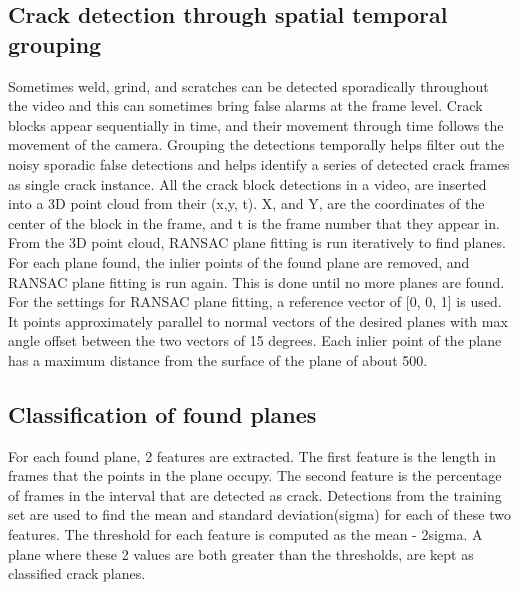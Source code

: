 \subsection{Crack detection through spatial temporal grouping}
            Sometimes weld, grind, and scratches can be detected sporadically throughout the video and this can sometimes bring false alarms at the frame level. Crack blocks appear sequentially in time, and their movement through time follows the movement of the camera.  Grouping the detections temporally helps filter out the noisy sporadic false detections and helps identify a series of detected crack frames as single crack instance.
All the crack block detections in a video, are inserted into a 3D point cloud from their (x,y, t). X, and Y, are the coordinates of the center of the block in the frame, and t is the frame number that they appear in.   From the 3D point cloud, RANSAC plane fitting is run iteratively to find planes.  For each plane found, the inlier points of the found plane are removed, and RANSAC plane fitting is run again. This is done until no more planes are found.  For the settings for RANSAC plane fitting, a reference vector of [0, 0, 1] is used. It points approximately parallel to normal vectors of the desired planes with max angle offset between the two vectors of 15 degrees. Each inlier point of the plane has a maximum distance from the surface of the plane of about 500.  

\subsection{Classification of found planes}
         For each found plane,  2 features are extracted. The first feature is the length in frames that the points in the plane occupy.  The second feature is the percentage of frames in the interval that are detected as crack. Detections from the training set are used to find the mean and standard deviation(sigma) for each of these two features.  The threshold for each feature is computed as the mean - 2sigma.    A plane  where these 2 values are both greater than the thresholds, are kept as classified crack planes.  
